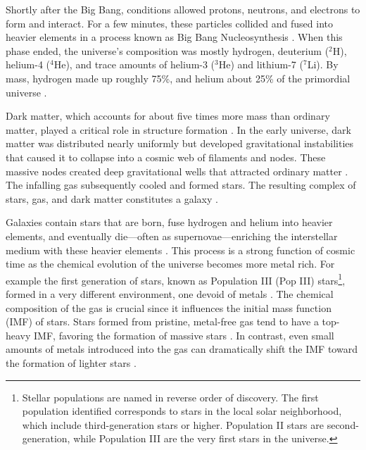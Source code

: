     Shortly after the Big Bang, conditions allowed protons, neutrons, and electrons to form and interact. For a few minutes, these particles collided and fused into heavier elements in a process known as Big Bang Nucleosynthesis \citep{2007ARNPS..57..463S}. When this phase ended, the universe's composition was mostly hydrogen, deuterium ($^2$H), helium-4 ($^4$He), and trace amounts of helium-3 ($^3$He) and lithium-7 ($^7$Li). By mass, hydrogen made up roughly 75\%, and helium about 25\% of the primordial universe \citep{1966ApJ...146..542P,2016RvMP...88a5004C}.

    Dark matter, which accounts for about five times more mass than ordinary matter, played a critical role in structure formation \citep{2020A&A...641A...6P}. In the early universe, dark matter was distributed nearly uniformly but developed gravitational instabilities that caused it to collapse into a cosmic web of filaments and nodes. These massive nodes created deep gravitational wells that attracted ordinary matter \citep{1974ApJ...187..425P}. The infalling gas subsequently cooled and formed stars. The resulting complex of stars, gas, and dark matter constitutes a galaxy \citep{2008LNP...740.....P,2010gfe..book.....M}.

    Galaxies contain stars that are born, fuse hydrogen and helium into heavier elements, and eventually die—often as supernovae—enriching the interstellar medium with these heavier elements \citep{2019A&ARv..27....3M}. This process is a strong function of cosmic time as the chemical evolution of the universe becomes more metal rich. For example the first generation of stars, known as Population III (Pop III) stars\footnote{Stellar populations are named in reverse order of discovery. The first population identified corresponds to stars in the local solar neighborhood, which include third-generation stars or higher. Population II stars are second-generation, while Population III are the very first stars in the universe.}, formed in a very different environment, one devoid of metals \citep{2002Sci...295...93A, 2005SSRv..117..445G, 2013RPPh...76k2901B}. The chemical composition of the gas is crucial since it influences the initial mass function (IMF) of stars. Stars formed from pristine, metal-free gas tend to have a top-heavy IMF, favoring the formation of massive stars \citep{2002ApJ...571...30S,2006MNRAS.369..825S}. In contrast, even small amounts of metals introduced into the gas can dramatically shift the IMF toward the formation of lighter stars \citep{2021MNRAS.508.4175C}.

